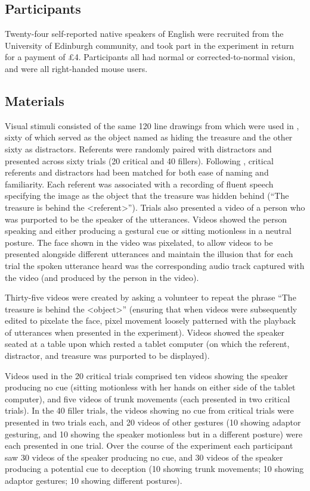 \documentclass[a4paper,man,natbib]{apa6}
\newcommand*{\spex}[1]{``{#1}''} %
\let\oldtodo\todo
\renewcommand*{\todo}[1]{\oldtodo[fancyline]{#1}}
\begin{document}
\subsection{Participants}
Twenty-four self-reported native speakers of English were recruited from the University of Edinburgh community, and took part in the experiment in return for a payment of \pounds{}4.
Participants all had normal or corrected-to-normal vision, and were all right-handed mouse users.

\subsection{Materials}
Visual stimuli consisted of the same 120 line drawings from \citet{Snodgrass1980} which were used in \citet{Loy2017}, sixty of which served as the object named as hiding the treasure and the other sixty as distractors.
Referents were randomly paired with distractors and presented across sixty trials (20 critical and 40 fillers). 
Following \citet{Loy2017}, critical referents and distractors had been matched for both ease of naming and familiarity.
Each referent was associated with a recording of fluent speech specifying the image as the object that the treasure was hidden behind (``The treasure is behind the <referent>'').
Trials also presented a video of a person who was purported to be the speaker of the utterances. 
Videos showed the person speaking and either producing a gestural cue or sitting motionless in a neutral posture.
The face shown in the video was pixelated, to allow videos to be presented alongside different utterances and maintain the illusion that for each trial the spoken utterance heard was the corresponding audio track captured with the video (and produced by the person in the video).

Thirty-five videos were created by asking a volunteer to repeat the phrase \spex{The treasure is behind the <object>} (ensuring that when videos were subsequently edited to pixelate the face, pixel movement loosely patterned with the playback of utterances when presented in the experiment). \todo{JK: maybe instead just: Thirty-five videos were created.}
Videos showed the speaker seated at a table upon which rested a tablet computer (on which the referent, distractor, and treasure was purported to be displayed).

Videos used in the 20 critical trials comprised ten videos showing the speaker producing no cue (sitting motionless with her hands on either side of the tablet computer), and five videos of trunk movements (each presented in two critical trials).
In the 40 filler trials, the videos showing no cue from critical trials were presented in two trials each, and 20 videos of other gestures (10 showing adaptor gesturing, and 10 showing the speaker motionless but in a different posture) were each presented in one trial.
Over the course of the experiment each participant saw 30 videos of the speaker producing no cue, and 30 videos of the speaker producing a potential cue to deception (10 showing trunk movements; 10 showing adaptor gestures; 10 showing different postures).
\end{document}
